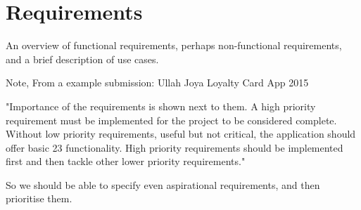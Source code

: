 \chapter*{Requirements}

An overview of functional requirements, perhaps non-functional requirements, and a brief description of use cases.

Note, From a example submission:
Ullah Joya
Loyalty Card App
2015

"Importance of the requirements is shown next to them. A high priority requirement
must be implemented for the project to be considered complete. Without low
priority requirements, useful but not critical, the application should offer basic
23
functionality. High priority requirements should be implemented first and then
tackle other lower priority requirements."

So we should be able to specify even aspirational requirements, and then prioritise them.